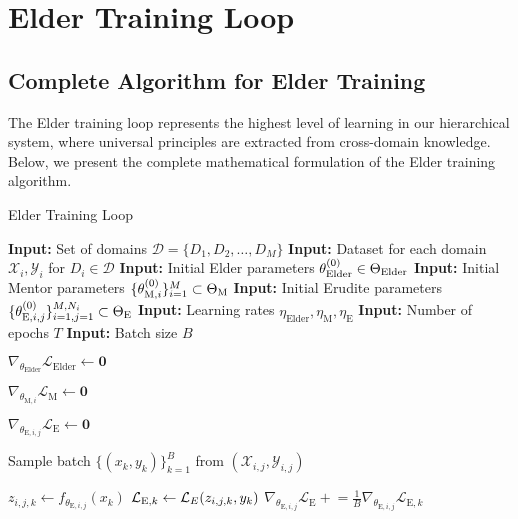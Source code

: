 \section{Elder Training Loop}

\subsection{Complete Algorithm for Elder Training}

The Elder training loop represents the highest level of learning in our hierarchical system, where universal principles are extracted from cross-domain knowledge. Below, we present the complete mathematical formulation of the Elder training algorithm.

\begin{algorithm}
\caption{Elder Training Loop}
\begin{algorithmic}[1]
\State \textbf{Input:} Set of domains $\mathcal{D} = \{D_1, D_2, \ldots, D_M\}$
\State \textbf{Input:} Dataset for each domain $\mathcal{X}_i, \mathcal{Y}_i$ for $D_i \in \mathcal{D}$
\State \textbf{Input:} Initial Elder parameters $\theta_{\text{Elder}}^{(0)} \in \Theta_{\text{Elder}}$
\State \textbf{Input:} Initial Mentor parameters $\{\theta_{\text{M},i}^{(0)}\}_{i=1}^M \subset \Theta_{\text{M}}$
\State \textbf{Input:} Initial Erudite parameters $\{\theta_{\text{E},i,j}^{(0)}\}_{i=1,j=1}^{M,N_i} \subset \Theta_{\text{E}}$
\State \textbf{Input:} Learning rates $\eta_{\text{Elder}}, \eta_{\text{M}}, \eta_{\text{E}}$
\State \textbf{Input:} Number of epochs $T$
\State \textbf{Input:} Batch size $B$

    \State $\nabla_{\theta_{\text{Elder}}} \mathcal{L}_{\text{Elder}} \gets \mathbf{0}$ 
    
        \State $\nabla_{\theta_{\text{M},i}} \mathcal{L}_{\text{M}} \gets \mathbf{0}$ 
        
         
            \State $\nabla_{\theta_{\text{E},i,j}} \mathcal{L}_{\text{E}} \gets \mathbf{0}$ 
            
            \State Sample batch $\{(x_k, y_k)\}_{k=1}^B$ from $(\mathcal{X}_{i,j}, \mathcal{Y}_{i,j})$
            
                \State $z_{i,j,k} \gets f_{\theta_{\text{E},i,j}}(x_k)$ 
                \State $\mathcal{L}_{\text{E},k} \gets \mathcal{L}_E(z_{i,j,k}, y_k)$ 
                \State $\nabla_{\theta_{\text{E},i,j}} \mathcal{L}_{\text{E}} \mathrel{+}= \frac{1}{B} \nabla_{\theta_{\text{E},i,j}} \mathcal{L}_{\text{E},k}$ 
            \EndFor
            

\end{algorithmic}
\end{algorithm}
